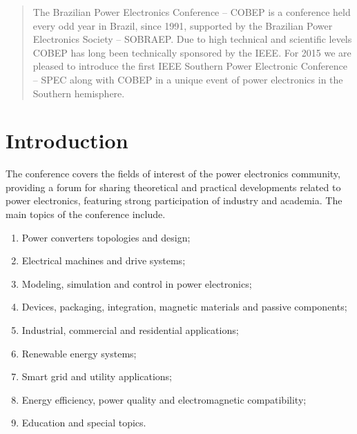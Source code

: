 \documentclass[letterpaper,oneside,onecolumn,draftclsnofoot,12pt,conference]{IEEEtran}
\begin{document}
\maketitle

\begin{abstract}
The Brazilian Power Electronics Conference -- COBEP is a conference held every odd year in Brazil, since 1991, supported by the Brazilian Power Electronics Society -- SOBRAEP. Due to high technical and scientific levels COBEP has long been technically sponsored by the IEEE. For 2015 we are pleased to introduce the first IEEE Southern Power Electronic Conference -- SPEC along with COBEP in a unique event of power electronics in the Southern hemisphere.
\end{abstract}





%
\IEEEpeerreviewmaketitle



\section{Introduction}

The conference covers the fields of interest of the power electronics community, providing a forum for sharing theoretical and practical developments related to power electronics, featuring strong participation of industry and academia.
The main topics of the conference include.


\begin{enumerate}
\item	Power converters topologies and design;
\item	Electrical machines and drive systems;
\item	Modeling, simulation and control in power electronics;
\item	Devices,   packaging,   integration,   magnetic   materials   and passive components;
\item	Industrial, commercial and residential applications;
\item	Renewable energy systems;
\item	Smart grid and utility applications;
\item	Energy  efficiency,   power   quality   and   electromagnetic compatibility;
\item	Education and special topics.	
\end{enumerate}
\end{document}
